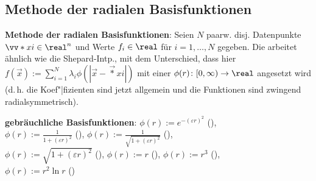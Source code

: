 \pagebreak

\subsection{%
    Methode der radialen Basisfunktionen%
}

\textbf{Methode der radialen Basisfunktionen}:
Seien $N$ paarw. disj. Datenpunkte $\vec*{x}{i} \in \real^n$ und Werte $f_i \in \real$
für $i = 1, \dotsc, N$ gegeben.
Die  arbeitet ähnlich wie die Shepard-Intp.,
mit dem Unterschied, dass hier $f(\vec{x}) := \sum_{i=1}^N \lambda_i \phi(|\vec{x} - \vec*{x}{i}|)$
mit einer  $\phi(r)\colon [0, \infty) \to \real$
angesetzt wird (d.\,h. die Koef"|fizienten sind jetzt allgemein und
die Funktionen sind zwingend radialsymmetrisch).

\textbf{gebräuchliche Basisfunktionen}:
$\phi(r) := e^{-(\varepsilon r)^2}$
(),\\
$\phi(r) := \frac{1}{1 + (\varepsilon r)^2}$
(),
$\phi(r) := \frac{1}{\sqrt{1 + (\varepsilon r)^2}}$
(),\\
$\phi(r) := \sqrt{1 + (\varepsilon r)^2}$
(),
$\phi(r) := r$
(),
$\phi(r) := r^3$
(),\\
$\phi(r) := r^2 \ln r$
()
%     
%     
%     
%     
%     
%     


